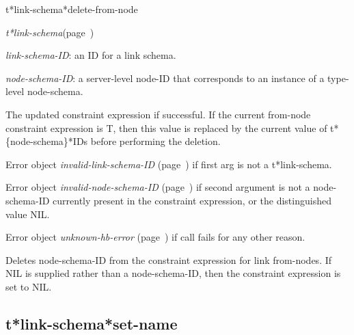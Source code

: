 \begin{description}
\item [Name:]  t*link-schema*delete-from-node

\item [Class:] {\sl t*link-schema}\hfill(page~\pageref{t*link-schema})

\item [Parameters:]
\item {\sl link-schema-ID}:  an ID for a link schema.

\item {\sl node-schema-ID}:  a server-level node-ID that corresponds to an 
instance of a type-level node-schema. 



\item [Return-value:]
The updated constraint expression if successful.
If the current from-node constraint expression is T, 
then this value is replaced by the current value
of t*\{node-schema\}*IDs before performing the deletion.

Error object {\sl invalid-link-schema-ID} (page~\pageref{invalid-link-schema-ID}) if first
arg is not a t*link-schema.

Error object {\sl invalid-node-schema-ID} (page~\pageref{invalid-node-schema-ID}) if second
argument is not a node-schema-ID currently present
in the constraint expression, or the distinguished
value NIL.

Error object {\sl unknown-hb-error} (page~\pageref{unknown-hb-error}) if call fails
for any other reason.

\item [Description:]

Deletes node-schema-ID from the constraint expression
for link from-nodes.  If NIL is supplied rather than
a node-schema-ID, then the constraint expression
is set to NIL.


\item [Public:]



\end{description}
\horizontalline

\subsection{t*link-schema*set-name}
\label{t*link-schema*set-name}

